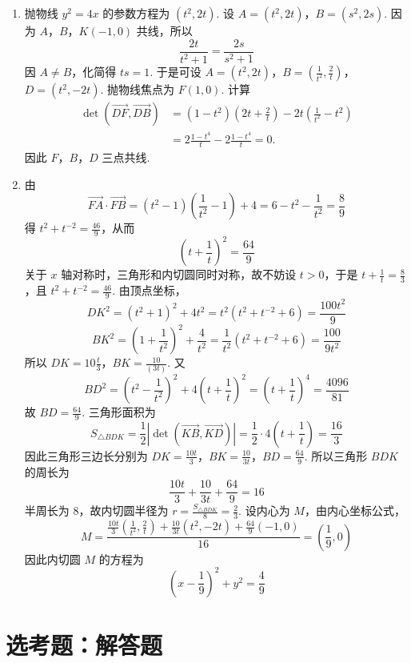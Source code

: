 \begin{solution}
\begin{enumerate}
\item 抛物线 \(y^{2}=4x\) 的参数方程为 \((t^{2},2t)\). 设
\(A=(t^{2},2t)\)，\(B=(s^{2},2s)\). 因为 \(A\)，\(B\)，\(K(-1,0)\) 共线，所以
\[
\frac{2t}{t^{2}+1}=\frac{2s}{s^{2}+1}
\]
因 \(A\ne B\)，化简得 \(ts=1\). 于是可设
\(A=(t^{2},2t)\)，\(B=\left(\frac1{t^{2}},\frac2t\right)\)，\(D=(t^{2},-2t)\).
抛物线焦点为 \(F(1,0)\). 计算
\[
\begin{aligned}
\det\left(\overrightarrow{DF},\overrightarrow{DB}\right)
&=(1-t^{2})\left(2t+\frac2t\right)-2t\left(\frac1{t^{2}}-t^{2}\right)\\
&=2\frac{1-t^{4}}{t}-2\frac{1-t^{4}}{t}=0.
\end{aligned}
\]
因此 \(F\)，\(B\)，\(D\) 三点共线.
\item 由
\[
\overrightarrow{FA}\cdot\overrightarrow{FB}
=(t^{2}-1)\left(\frac1{t^{2}}-1\right)+4
=6-t^{2}-\frac1{t^{2}}=\frac89
\]
得 \(t^{2}+t^{-2}=\frac{46}{9}\)，从而
\[
\left(t+\frac1t\right)^{2}=\frac{64}{9}
\]
关于 \(x\) 轴对称时，三角形和内切圆同时对称，故不妨设 \(t>0\)，于是
\(t+\frac{1}{t}=\frac{8}{3}\)，且 \(t^{2}+t^{-2}=\frac{46}{9}\). 由顶点坐标，
\[
DK^{2}=(t^{2}+1)^{2}+4t^{2}
=t^{2}\left(t^{2}+t^{-2}+6\right)=\frac{100t^{2}}{9}
\]
\[
BK^{2}=\left(1+\frac1{t^{2}}\right)^{2}+\frac4{t^{2}}
=\frac1{t^{2}}\left(t^{2}+t^{-2}+6\right)=\frac{100}{9t^{2}}
\]
所以 \(DK=10\frac{t}{3}\)，\(BK=\frac{10}{(3t)}\). 又
\[
BD^{2}=\left(t^{2}-\frac1{t^{2}}\right)^{2}
+4\left(t+\frac1t\right)^{2}
=\left(t+\frac1t\right)^{4}=\frac{4096}{81}
\]
故 \(BD=\frac{64}{9}\). 三角形面积为
\[
S_{\triangle BDK}
=\frac12\left|\det\left(\overrightarrow{KB},\overrightarrow{KD}\right)\right|
=\frac12\cdot4\left(t+\frac1t\right)=\frac{16}{3}
\]
因此三角形三边长分别为
\(DK=\frac{10t}{3}\)，\(BK=\frac{10}{3t}\)，\(BD=\frac{64}{9}\).
所以三角形 \(BDK\) 的周长为
\[
\frac{10t}{3}+\frac{10}{3t}+\frac{64}{9}=16
\]
半周长为 \(8\)，故内切圆半径为 \(r=\frac{S_{\triangle BDK}}{8}=\frac{2}{3}\). 设内心为 \(M\)，由内心坐标公式，
\[
M=\frac{\frac{10t}{3}\left(\frac1{t^{2}},\frac2t\right)
+\frac{10}{3t}(t^{2},-2t)+\frac{64}{9}(-1,0)}{16}
=\left(\frac19,0\right)
\]
因此内切圆 \(M\) 的方程为
\[
\left(x-\frac19\right)^{2}+y^{2}=\frac49
\]
\end{enumerate}
\end{solution}

\section{选考题：解答题}

